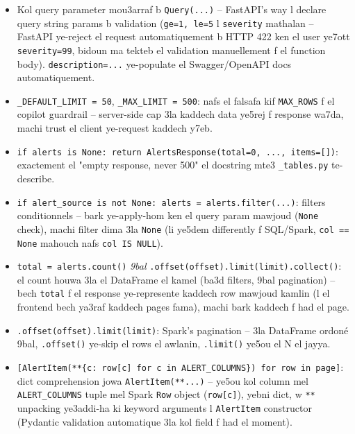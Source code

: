 \documentclass[11pt,a4paper]{report}
\DeclareRobustCommand{\code}[1]{\texttt{#1}}
\begin{document}
\begin{itemize}
  \item Kol query parameter mou3arraf b \code{Query(...)} -- FastAPI's
        way l declare query string params b validation (\code{ge=1,
        le=5} l \code{severity} mathalan -- FastAPI ye-reject el request
        automatiquement b HTTP 422 ken el user ye7ott \code{severity=99},
        bidoun ma tekteb el validation manuellement f el function body).
        \code{description=...} ye-populate el Swagger/OpenAPI docs
        automatiquement.
  \item \code{\_DEFAULT\_LIMIT = 50}, \code{\_MAX\_LIMIT = 500}: nafs
        el falsafa kif \code{MAX\_ROWS} f el copilot guardrail -- server-side
        cap 3la kaddech data ye5rej f response wa7da, machi trust el
        client ye-request kaddech y7eb.
  \item \code{if alerts is None: return AlertsResponse(total=0, ...,
        items=[])}: exactement el "empty response, never 500" el
        docstring mte3 \code{\_tables.py} te-describe.
  \item \code{if alert\_source is not None: alerts = alerts.filter(...)}:
        filters conditionnels -- bark ye-apply-hom ken el query param
        mawjoud (\code{None} check), machi filter dima 3la \code{None}
        (li ye5dem differently f SQL/Spark, \code{col == None} mahouch
        nafs \code{col IS NULL}).
  \item \code{total = alerts.count()} \emph{9bal} \code{.offset(offset).limit(limit).collect()}:
        el count houwa 3la el DataFrame el kamel (ba3d filters, 9bal
        pagination) -- bech \code{total} f el response ye-represente
        kaddech row mawjoud kamlin (l el frontend bech ya3raf kaddech
        pages fama), machi bark kaddech f had el page.
  \item \code{.offset(offset).limit(limit)}: Spark's pagination -- 3la
        DataFrame ordoné 9bal, \code{.offset()} ye-skip el rows el
        awlanin, \code{.limit()} ye5ou el N el jayya.
  \item \code{[AlertItem(**\{c: row[c] for c in ALERT\_COLUMNS\}) for row
        in page]}: dict comprehension jowa \code{AlertItem(**...)} --
        ye5ou kol column mel \code{ALERT\_COLUMNS} tuple mel Spark
        \code{Row} object (\code{row[c]}), yebni dict, w \code{**} unpacking
        ye3addi-ha ki keyword arguments l \code{AlertItem} constructor
        (Pydantic validation automatique 3la kol field f had el moment).
\end{itemize}
\end{document}
